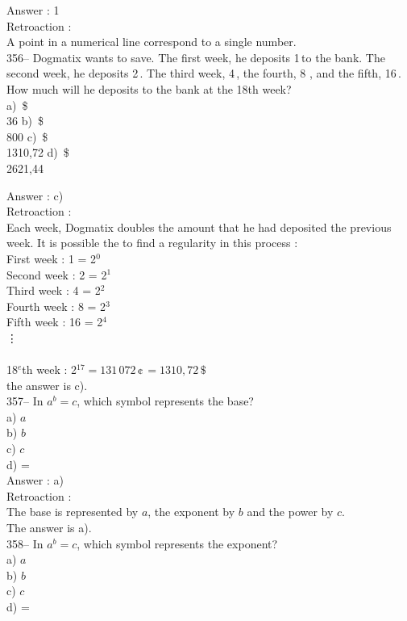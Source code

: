 ﻿\documentclass[letterpaper, 12pt]{article}
\begin{document}
Answer : 1\\

Retroaction : \\
A point in a numerical line correspond to a single number.\\

356-- Dogmatix wants to save. The first week, he deposits 1\,\cent to the bank. The second week, he deposits
2\,\cent. The third week, 4\,\cent, the fourth, 8\,\cent\,, and the fifth, 16\,\cent.  How much will he deposits to the bank at the 18th week?\\
a) \,\$\\36
b) \,\$\\800
c) \,\$\\1310,72
d) \,\$\\2621,44

Answer : c) \\

Retroaction : \\
Each week, Dogmatix doubles the amount that he had deposited the previous week. It is possible the to find a regularity in this process :\\
First week : 1\,\cent\,= 2$^{0}$\\
Second week : 2\,\cent\,= 2$^{1}$\\
Third week : 4\,\cent\,= 2$^{2}$\\
Fourth week : 8\,\cent\,= 2$^{3}$\\
Fifth week : 16\,\cent\,= 2$^{4}$\\
\vdots\\\\
18$^e$th week : 2$^{17}=131\,072\,\cent\,=1310,72\,\$$\\
the answer is c).\\

357-- In $a^{b}=c$, which symbol represents the base?\\
a) $a$\\
b) $b$\\
c) $c$\\
d) =\\

Answer : a)\\

Retroaction : \\
The base is represented by $a$, the exponent by $b$ and the power by $c$.\\
The answer is a).\\

358-- In $a^{b}=c$, which symbol represents the exponent?\\
a) $a$\\
b) $b$\\
c) $c$\\
d) =\\
\end{document}
